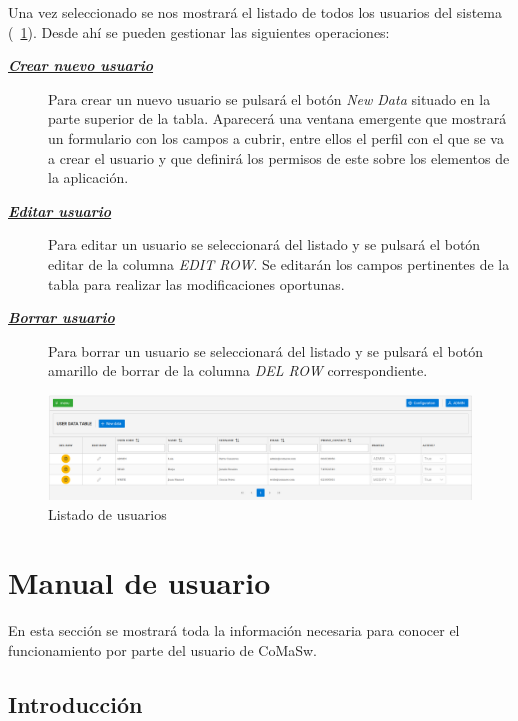 Una vez seleccionado se nos mostrará el listado de todos los usuarios del sistema (\figurename~\ref{fig:listado-usuarios}).
Desde ahí se pueden gestionar las siguientes operaciones:
\begin{description}
\item[\underline{\textsl{\textbf{Crear nuevo usuario}}}] Para crear un nuevo usuario se pulsará el botón \emph{New Data} situado en la parte superior de la tabla. Aparecerá una ventana emergente que mostrará un formulario con los campos a cubrir, entre ellos el perfil con el que se va a crear el usuario y que definirá los permisos de este sobre los elementos de la aplicación.

\item[\underline{\textsl{\textbf{Editar usuario}}}] Para editar un usuario se seleccionará del listado y se pulsará el botón editar de la columna \emph{EDIT ROW}. Se editarán los campos pertinentes de la tabla para realizar las modificaciones oportunas. 

\item[\underline{\textsl{\textbf{Borrar usuario}}}] Para borrar un usuario se seleccionará del listado y se pulsará el botón amarillo de borrar de la columna \emph{DEL ROW} correspondiente.
\end{description}


\begin{figure}[H]
  \centering
  \includegraphics[width=\textwidth]{imaxes/gestion-usuarios-02.png}
  \caption{Listado de usuarios}
  \label{fig:listado-usuarios}
\end{figure}



\section{Manual de usuario}
\label{sec:manual-usuario}

En esta sección se mostrará toda la información necesaria para conocer el funcionamiento por parte del usuario de CoMaSw.


\subsection{Introducción}
\label{sub:introduccion}


